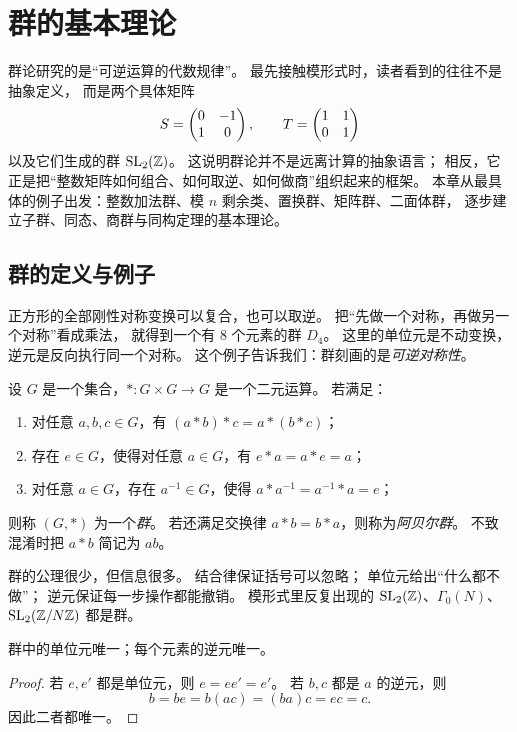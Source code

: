 \chapter{群的基本理论}
群论研究的是“可逆运算的代数规律”。
最先接触模形式时，读者看到的往往不是抽象定义，
而是两个具体矩阵
\[ S=\begin{pmatrix} 0&-1\\1&0 \end{pmatrix},\qquad T=\begin{pmatrix} 1&1\\0&1 \end{pmatrix} \]
以及它们生成的群 $\mathrm{SL}_2(\mathbb{Z})$。
这说明群论并不是远离计算的抽象语言；
相反，它正是把“整数矩阵如何组合、如何取逆、如何做商”组织起来的框架。
本章从最具体的例子出发：整数加法群、模 $n$ 剩余类、置换群、矩阵群、二面体群，
逐步建立子群、同态、商群与同构定理的基本理论。
\section{群的定义与例子}
\begin{example}[从对称变换开始]
正方形的全部刚性对称变换可以复合，也可以取逆。
把“先做一个对称，再做另一个对称”看成乘法，
就得到一个有 $8$ 个元素的群 $D_4$。
这里的单位元是不动变换，逆元是反向执行同一个对称。
这个例子告诉我们：群刻画的是\emph{可逆对称性}。
\end{example}
\begin{definition}
设 $G$ 是一个集合，$*:G\times G\to G$ 是一个二元运算。
若满足：
\begin{enumerate}[label=\textnormal{(G\arabic*)}, leftmargin=3.5em]
  \item 对任意 $a,b,c\in G$，有 $(a*b)*c=a*(b*c)$；
  \item 存在 $e\in G$，使得对任意 $a\in G$，有 $e*a=a*e=a$；
  \item 对任意 $a\in G$，存在 $a^{-1}\in G$，使得 $a*a^{-1}=a^{-1}*a=e$；
\end{enumerate}
则称 $(G,*)$ 为一个\emph{群}。
若还满足交换律 $a*b=b*a$，则称为\emph{阿贝尔群}。
不致混淆时把 $a*b$ 简记为 $ab$。
\end{definition}
\begin{remark}
群的公理很少，但信息很多。
结合律保证括号可以忽略；
单位元给出“什么都不做”；
逆元保证每一步操作都能撤销。
模形式里反复出现的 $\mathrm{SL}_2(\mathbb{Z})$、$\Gamma_0(N)$、$\mathrm{SL}_2(\mathbb{Z}/N\mathbb{Z})$ 都是群。
\end{remark}
\begin{proposition}
群中的单位元唯一；每个元素的逆元唯一。
\end{proposition}
\begin{proof}
若 $e,e'$ 都是单位元，则 $e=ee'=e'$。
若 $b,c$ 都是 $a$ 的逆元，则
\[ b=be=b(ac)=(ba)c=ec=c. \]
因此二者都唯一。
\end{proof}
